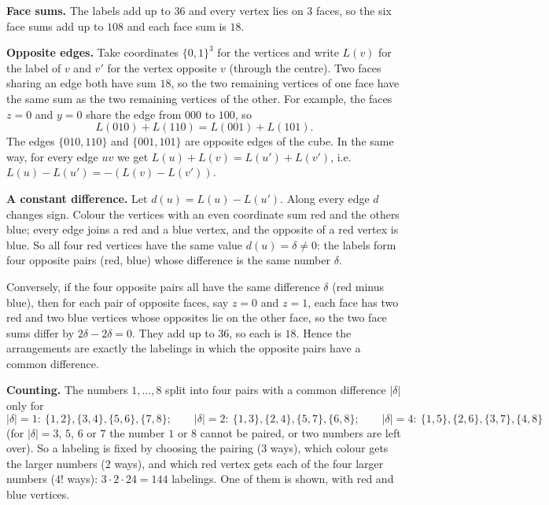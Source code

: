 \textbf{Face sums.} The labels add up to $36$ and every vertex lies on $3$ faces, so the six face sums add up to $108$ and each face sum is $18$.

\textbf{Opposite edges.} Take coordinates $\{0,1\}^3$ for the vertices and write $L(v)$ for the label of $v$ and $v'$ for the vertex opposite $v$ (through the centre). Two faces sharing an edge both have sum $18$, so the two remaining vertices of one face have the same sum as the two remaining vertices of the other. For example, the faces $z=0$ and $y=0$ share the edge from $000$ to $100$, so
\[L(010)+L(110)=L(001)+L(101).\]
The edges $\{010,110\}$ and $\{001,101\}$ are opposite edges of the cube. In the same way, for every edge $uv$ we get $L(u)+L(v)=L(u')+L(v')$, i.e. $L(u)-L(u')=-\left(L(v)-L(v')\right)$.

\textbf{A constant difference.} Let $d(u)=L(u)-L(u')$. Along every edge $d$ changes sign. Colour the vertices with an even coordinate sum red and the others blue; every edge joins a red and a blue vertex, and the opposite of a red vertex is blue. So all four red vertices have the same value $d(u)=\delta\ne0$: the labels form four opposite pairs (red, blue) whose difference is the same number $\delta$.

Conversely, if the four opposite pairs all have the same difference $\delta$ (red minus blue), then for each pair of opposite faces, say $z=0$ and $z=1$, each face has two red and two blue vertices whose opposites lie on the other face, so the two face sums differ by $2\delta-2\delta=0$. They add up to $36$, so each is $18$. Hence the arrangements are exactly the labelings in which the opposite pairs have a common difference.

\textbf{Counting.} The numbers $1,\dots,8$ split into four pairs with a common difference $|\delta|$ only for
\[|\delta|=1:\ \{1,2\},\{3,4\},\{5,6\},\{7,8\};\qquad|\delta|=2:\ \{1,3\},\{2,4\},\{5,7\},\{6,8\};\qquad|\delta|=4:\ \{1,5\},\{2,6\},\{3,7\},\{4,8\}\]
(for $|\delta|=3$, $5$, $6$ or $7$ the number $1$ or $8$ cannot be paired, or two numbers are left over). So a labeling is fixed by choosing the pairing ($3$ ways), which colour gets the larger numbers ($2$ ways), and which red vertex gets each of the four larger numbers ($4!$ ways): $3\cdot2\cdot24=144$ labelings. One of them is shown, with red and blue vertices.

